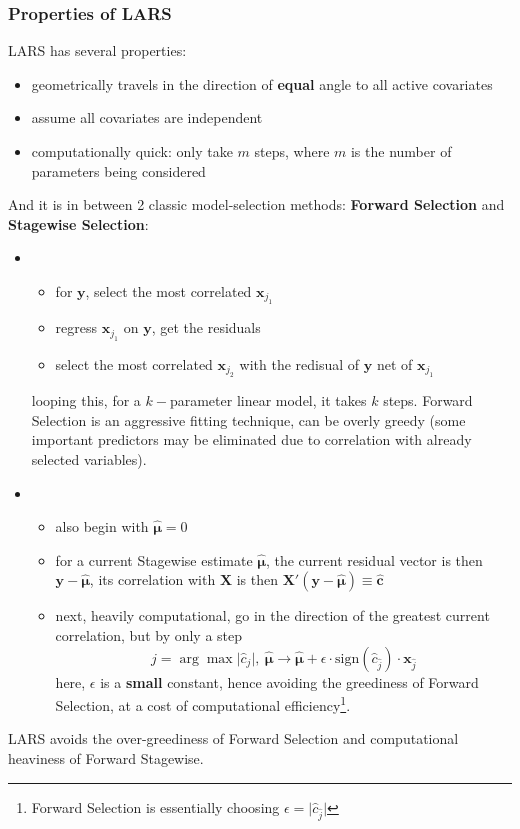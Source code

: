 \documentclass[twoside]{article}
\begin{document}
\subsubsection*{Properties of LARS}
LARS has several properties:
\begin{itemize}
    \item geometrically travels in the direction of \textbf{equal} angle to all active covariates
    \item assume all covariates are independent
    \item computationally quick: only take $m$ steps, where $m$ is the number of parameters being considered
\end{itemize}
And it is in between 2 classic model-selection methods: \textbf{Forward Selection} and \textbf{Stagewise Selection}:
\begin{itemize}
    \item {}
    \begin{itemize}
        \item for $\mathbf{y}$, select the most correlated $\mathbf{x}_{j_1}$
        \item regress $\mathbf{x}_{j_1}$ on $\mathbf{y}$, get the residuals
        \item select the most correlated $\mathbf{x}_{j_2}$ with the redisual of $\mathbf{y}$ net of $\mathbf{x}_{j_1}$
    \end{itemize}
    looping this, for a $k-$parameter linear model, it takes $k$ steps. Forward Selection is an aggressive fitting technique, can be overly greedy (some important predictors may be eliminated due to correlation with already selected variables).
    \item {}
    \begin{itemize}
        \item also begin with $\hat{\boldsymbol{\mu}}=0$
        \item for a current Stagewise estimate $\hat{\boldsymbol{\mu}}$, the current residual vector is then $\mathbf{y}-\hat{\boldsymbol{\mu}}$, its correlation with $\mathbf{X}$ is then  $\mathbf{X'}(\mathbf{y}-\hat{\boldsymbol{\mu}})\equiv \hat{\mathbf{c}}$
        \item next, heavily computational, go in the direction of the greatest current correlation, but by only a  step $$ \hat{j}= \arg\max\lvert \hat{c}_j \rvert, \ \hat{\boldsymbol{\mu}}\rightarrow \hat{\boldsymbol{\mu}}+\epsilon\cdot \mathrm{sign}(\hat{c}_{\hat{j}})\cdot \mathbf{x}_{\hat{j}} $$
        here, $\epsilon$ is a \textbf{small} constant, hence avoiding the greediness of Forward Selection, at a cost of computational efficiency\footnote{Forward Selection is essentially choosing $\epsilon=\lvert \hat{c}_{\hat{j}} \rvert$}.
    \end{itemize}
\end{itemize}
LARS avoids the over-greediness of Forward Selection and computational heaviness of Forward Stagewise.
\end{document}
